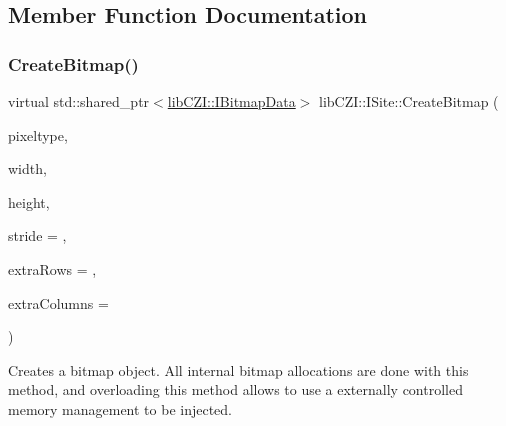 \subsection{Member Function Documentation}
\mbox{\label{classlib_c_z_i_1_1_i_site_ab1b59f522c0dfdce2474036e4ac6cc23}} 
\subsubsection{\texorpdfstring{Create\+Bitmap()}{CreateBitmap()}}
{\footnotesize\ttfamily virtual std\+::shared\+\_\+ptr$<$\hyperlink{classlib_c_z_i_1_1_i_bitmap_data}{lib\+C\+Z\+I\+::\+I\+Bitmap\+Data}$>$ lib\+C\+Z\+I\+::\+I\+Site\+::\+Create\+Bitmap (\begin{DoxyParamCaption}\item[{\hyperlink{namespacelib_c_z_i_abf8ce12ab88b06c8b3b47efbb5e2e834}{lib\+C\+Z\+I\+::\+Pixel\+Type}}]{pixeltype,  }\item[{std\+::uint32\+\_\+t}]{width,  }\item[{std\+::uint32\+\_\+t}]{height,  }\item[{std\+::uint32\+\_\+t}]{stride = {},  }\item[{std\+::uint32\+\_\+t}]{extra\+Rows = {},  }\item[{std\+::uint32\+\_\+t}]{extra\+Columns = {} }\end{DoxyParamCaption})\hspace{0.3cm}{\ttfamily [pure virtual]}}

Creates a bitmap object. All internal bitmap allocations are done with this method, and overloading this method allows to use a externally controlled memory management to be injected.


